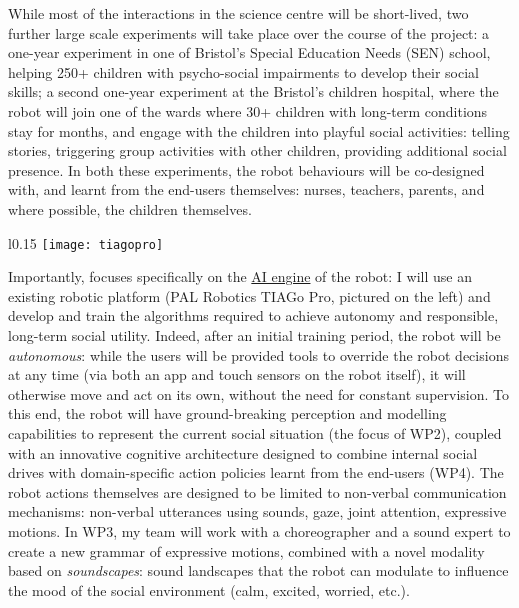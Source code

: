 While most of the interactions in the science centre will be short-lived, two further
large scale experiments will take place over the course of the project: a
one-year experiment in one of Bristol's Special Education Needs (SEN) school,
helping 250+ children with psycho-social impairments to develop their social
skills; a second one-year experiment at the Bristol's children hospital, where
the robot will join one of the wards where 30+ children with long-term conditions
stay for months, and engage with the children into playful social activities: telling
stories, triggering group activities with other children, providing additional
social presence. In both these experiments, the robot behaviours will be
co-designed with, and learnt from the end-users themselves: nurses, teachers,
parents, and where possible, the children themselves.


\begin{wrapfigure}[11]{l}{0.15\linewidth}
    \centering
    \vspace{-10pt}
    \texttt{[image: tiagopro]}
    \label{fig|tiagopro}
\end{wrapfigure}

Importantly, \project focuses specifically on the \ul{AI engine} of the robot: I
will use an existing robotic platform (PAL Robotics TIAGo Pro, pictured on the left) and
develop and train the algorithms required to achieve autonomy and responsible,
long-term social utility. Indeed, after an initial training period, the robot
will be \emph{autonomous}: while the users will be provided tools to override
the robot decisions at any time (via both an app and touch sensors on the robot
itself), it will otherwise move and act on its own, without the need for
constant supervision. To this end, the robot will have ground-breaking
perception and modelling capabilities to represent the current social situation
(the focus of WP2), coupled with an innovative cognitive architecture designed
to combine internal social drives with domain-specific action policies learnt
from the end-users (WP4). The robot actions themselves are designed to be
limited to non-verbal communication mechanisms: non-verbal utterances using
sounds, gaze, joint attention, expressive motions. In WP3, my team will work
with a choreographer and a sound expert to create a new grammar of expressive
motions, combined with a novel modality based on \emph{soundscapes}: sound
landscapes that the robot can modulate to influence the mood of the social
environment (calm, excited, worried, etc.).

